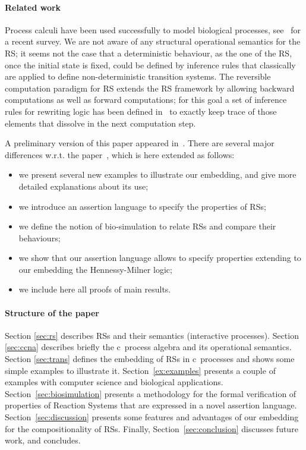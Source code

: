 \paragraph{Related work}

Process calculi have been used successfully to model
biological processes, see~\cite{BBDFH18} for a recent survey.
We are not aware of any 
structural operational semantics for the RS; it seems not the case
that a deterministic behaviour, as the one of the RS, once the initial state is 
fixed, could be defined by inference rules that classically are applied 
to define non-deterministic transition systems.
The reversible computation paradigm for RS extends the RS framework  by
allowing  backward computations as well as forward computations; for this 
goal a set of inference rules for rewriting logic has been 
defined in~\cite{10.1007/978-3-319-73359-3_3}
to exactly keep trace of those elements that  dissolve in the next 
computation step.


A preliminary version of this paper appeared in~\cite{BBF19}.
There are several major differences w.r.t. the paper~\cite{BBF19}, which is here extended as follows:
\begin{itemize}
\item we present several new examples to illustrate our 
{\color{red} embedding},
and give more detailed explanations about its use;
\item we introduce an assertion language to specify the properties of RSs;
\item we define the notion of bio-simulation to relate RSs
and compare their behaviours;
\item we show that our assertion language allows to specify properties extending to our
{\color{red} embedding}
the Hennessy-Milner logic;
\item we include here all proofs of main results.
\end{itemize}
 
\paragraph{Structure of the paper} 

Section \ref{sec:rs} 
describes RSs and their semantics (interactive processes).
Section \ref{sec:ccna} describes briefly the c\CNA \ process algebra and
its operational semantics.
Section \ref{sec:trans} defines the embedding of RSs in
c\CNA \ processes and shows some simple examples to illustrate 
it.
Section~\ref{ex:examples} presents a couple of examples with computer science and biological applications.
Section~\ref{sec:biosimulation} presents a methodology for the formal verification of
properties of Reaction Systems that are expressed in a novel assertion language.
Section~\ref{sec:discussion} presents some features and 
advantages of our embedding for the compositionality of RSs.
Finally, Section~\ref{sec:conclusion}
discusses future work, and concludes.


